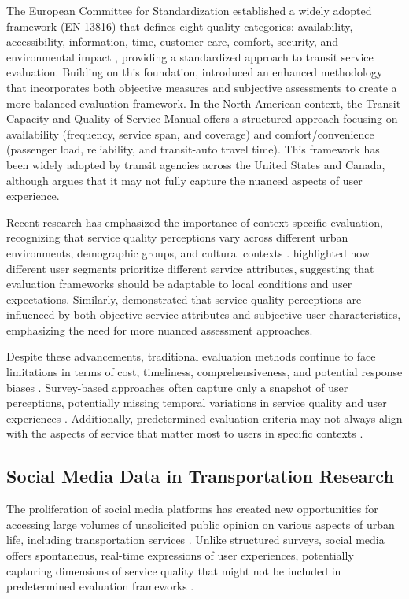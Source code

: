 \documentclass[a4paper,fleqn,12pt]{cas-sc}
\begin{document}
The European Committee for Standardization established a widely adopted framework (EN 13816) that defines eight quality categories: availability, accessibility, information, time, customer care, comfort, security, and environmental impact \citep{europeancommittee2002}, providing a standardized approach to transit service evaluation. Building on this foundation, \cite{de2018novel} introduced an enhanced methodology that incorporates both objective measures and subjective assessments to create a more balanced evaluation framework. In the North American context, the Transit Capacity and Quality of Service Manual \citep{kittelson2003transit} offers a structured approach focusing on availability (frequency, service span, and coverage) and comfort/convenience (passenger load, reliability, and transit-auto travel time). This framework has been widely adopted by transit agencies across the United States and Canada, although \cite{morton2016perceptions} argues that it may not fully capture the nuanced aspects of user experience.

Recent research has emphasized the importance of context-specific evaluation, recognizing that service quality perceptions vary across different urban environments, demographic groups, and cultural contexts \citep{dell2018methodology, diab2017transit}. \cite{zhao2013web} highlighted how different user segments prioritize different service attributes, suggesting that evaluation frameworks should be adaptable to local conditions and user expectations. Similarly, \cite{wang2020analyzing} demonstrated that service quality perceptions are influenced by both objective service attributes and subjective user characteristics, emphasizing the need for more nuanced assessment approaches.

Despite these advancements, traditional evaluation methods continue to face limitations in terms of cost, timeliness, comprehensiveness, and potential response biases \citep{hensher2003service, de2018novel}. Survey-based approaches often capture only a snapshot of user perceptions, potentially missing temporal variations in service quality and user experiences \citep{chang2013exploring}. Additionally, predetermined evaluation criteria may not always align with the aspects of service that matter most to users in specific contexts \citep{van2019influence, tyrinopoulos2008public}.

\subsection{Social Media Data in Transportation Research}
The proliferation of social media platforms has created new opportunities for accessing large volumes of unsolicited public opinion on various aspects of urban life, including transportation services \citep{collins2013social, schweitzer2012social}. Unlike structured surveys, social media offers spontaneous, real-time expressions of user experiences, potentially capturing dimensions of service quality that might not be included in predetermined evaluation frameworks \citep{gal2014traveling, luong2015mining}.
\end{document}
